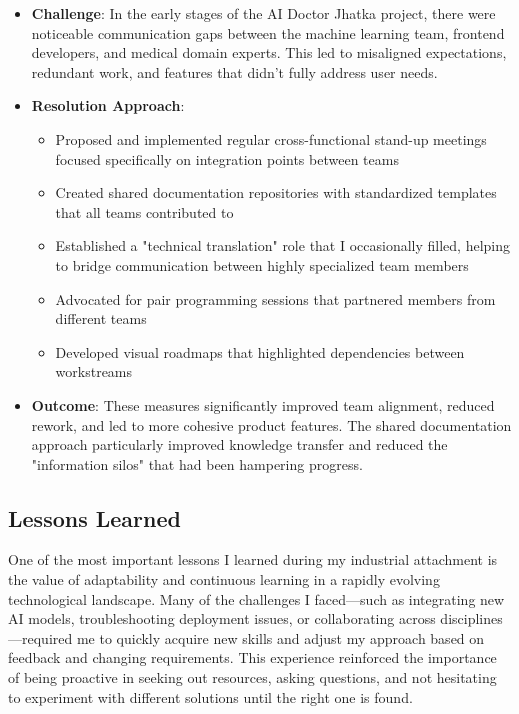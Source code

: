 \documentclass[12pt,a4paper]{article}
\begin{document}
\begin{itemize}
    \item \textbf{Challenge}: In the early stages of the AI Doctor Jhatka project, there were noticeable communication gaps between the machine learning team, frontend developers, and medical domain experts. This led to misaligned expectations, redundant work, and features that didn't fully address user needs.
    
    \item \textbf{Resolution Approach}:
    \begin{itemize}
        \item Proposed and implemented regular cross-functional stand-up meetings focused specifically on integration points between teams
        \item Created shared documentation repositories with standardized templates that all teams contributed to
        \item Established a "technical translation" role that I occasionally filled, helping to bridge communication between highly specialized team members
        \item Advocated for pair programming sessions that partnered members from different teams
        \item Developed visual roadmaps that highlighted dependencies between workstreams
    \end{itemize}
    
    \item \textbf{Outcome}: These measures significantly improved team alignment, reduced rework, and led to more cohesive product features. The shared documentation approach particularly improved knowledge transfer and reduced the "information silos" that had been hampering progress.
\end{itemize}

\newpage
\subsection{Lessons Learned}

One of the most important lessons I learned during my industrial attachment is the value of adaptability and continuous learning in a rapidly evolving technological landscape. Many of the challenges I faced—such as integrating new AI models, troubleshooting deployment issues, or collaborating across disciplines—required me to quickly acquire new skills and adjust my approach based on feedback and changing requirements. This experience reinforced the importance of being proactive in seeking out resources, asking questions, and not hesitating to experiment with different solutions until the right one is found.
\end{document}
